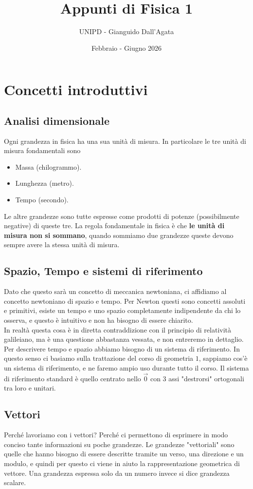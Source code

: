 \documentclass[11pt]{scrartcl}
\begin{document}
	\title{Appunti di Fisica 1}
	\subtitle{UNIPD - Gianguido Dall'Agata}
	\date{Febbraio - Giugno 2026}
	
	
	\maketitle
	
	\tableofcontents
	
	\newpage
	
	\section{Concetti introduttivi}
	\subsection{Analisi dimensionale}
	Ogni grandezza in fisica ha una sua unità di misura. In particolare le tre unità di misura fondamentali sono 
	\begin{itemize}
		\item Massa (chilogrammo).
		\item Lunghezza (metro).
		\item Tempo (secondo).
	\end{itemize}
	Le altre grandezze sono tutte espresse come prodotti di potenze (possibilmente negative) di queste tre. La regola fondamentale in fisica è che \textbf{le unità di misura non si sommano}, quando sommiamo due grandezze queste devono sempre avere la stessa unità di misura.
	\subsection{Spazio, Tempo e sistemi di riferimento}
	Dato che questo sarà un concetto di meccanica newtoniana, ci affidiamo al concetto newtoniano di spazio e tempo. Per Newton questi sono concetti assoluti e primitivi, esiste un tempo e uno spazio completamente indipendente da chi lo osserva, e questo è intuitivo e non ha bisogno di essere chiarito. \\
	In realtà questa cosa è in diretta contraddizione con il principio di relatività galileiano, ma è una questione abbastanza vessata, e non entreremo in dettaglio. \\
	Per descrivere tempo e spazio abbiamo bisogno di un sistema di riferimento. In questo senso ci basiamo sulla trattazione del corso di geometria $1$, sappiamo cos'è un sistema di riferimento, e ne faremo ampio uso durante tutto il corso. Il sistema di riferimento standard è quello centrato nello $\vec{0}$ con $3$ assi "destrorsi" ortogonali tra loro e unitari.
	\subsection{Vettori}
	Perché lavoriamo con i vettori? Perché ci permettono di esprimere in modo conciso tante informazioni su poche grandezze. Le grandezze "vettoriali" sono quelle che hanno bisogno di essere descritte tramite un verso, una direzione e un modulo, e quindi per questo ci viene in aiuto la rappresentazione geometrica di vettore. Una grandezza espressa solo da un numero invece si dice grandezza scalare.
\end{document}
